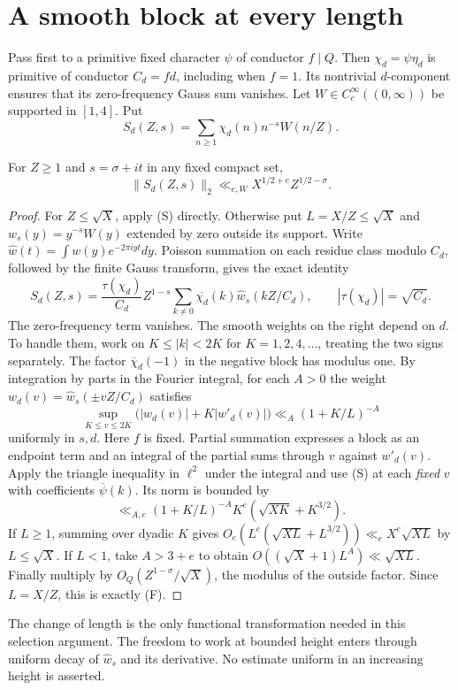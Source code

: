 \documentclass[11pt]{article}
\begin{document}
\section{A smooth block at every length}\label{sec:block}
Pass first to a primitive fixed character $\psi$ of conductor $f\mid Q$. Then $\chi_d=\psi\eta_d$ is primitive of conductor $C_d=fd$, including when $f=1$. Its nontrivial $d$-component ensures that its zero-frequency Gauss sum vanishes. Let $W\in C_c^\infty((0,\infty))$ be supported in $[1,4]$. Put
\[
 S_d(Z,s)=\sum_{n\ge1}\chi_d(n)n^{-s} W(n/Z).
\]
\begin{lem}\label{lem:block}
For $Z\ge1$ and $s=\sigma+it$ in any fixed compact set,
\[
        \|S_d(Z,s)\|_2\ll_{e,W}X^{1/2+e} Z^{1/2-\sigma}.       \tag{F}
\]
\end{lem}
\begin{proof}
For $Z\le\sqrt X$, apply (S) directly. Otherwise put $L=X/Z\le\sqrt X$ and $w_s(y)=y^{-s}W(y)$ extended by zero outside its support. Write $\widehat w(t)=\int w(y)e^{-2\pi iyt}dy$. Poisson summation on each residue class modulo $C_d$, followed by the finite Gauss transform, gives the exact identity
\[
 S_d(Z,s)=\frac{\tau(\chi_d)}{C_d} Z^{1-s}
       \sum_{k\ne0}\overline{\chi_d}(k)\widehat w_s(kZ/C_d),
 \qquad |\tau(\chi_d)|=\sqrt{C_d}.
\]
The zero-frequency term vanishes. The smooth weights on the right depend on $d$. To handle them, work on $K\le |k|<2K$ for $K=1,2,4,\ldots$, treating the two signs separately. The factor $\overline\chi_d(-1)$ in the negative block has modulus one. By integration by parts in the Fourier integral, for each $A>0$ the weight $w_d(v)=\widehat w_s(\pm v Z/C_d)$ satisfies
\[
 \sup_{K\le v\le2K}\big(|w_d(v)|+K|w'_d(v)|\big)
                  \ll_A (1+K/L)^{-A}
\]
uniformly in $s,d$. Here $f$ is fixed. Partial summation expresses a block as an endpoint term and an integral of the partial sums through $v$ against $w'_d(v)$. Apply the triangle inequality in $\ell^2$ under the integral and use (S) at each \emph{fixed} $v$ with coefficients $\overline\psi(k)$. Its norm is bounded by
\[
 \ll_{A,e} (1+K/L)^{-A}K^e(\sqrt{XK}+K^{3/2}).
\]
If $L\ge1$, summing over dyadic $K$ gives $O_e(L^e(\sqrt{XL}+L^{3/2}))\ll_e X^e\sqrt{XL}$ by $L\le\sqrt X$. If $L<1$, take $A>3+e$ to obtain $O((\sqrt X+1)L^A)\ll\sqrt{XL}$. Finally multiply by $O_Q(Z^{1-\sigma}/\sqrt X)$, the modulus of the outside factor. Since $L=X/Z$, this is exactly (F).
\end{proof}
The change of length is the only functional transformation needed in this selection argument. The freedom to work at bounded height enters through uniform decay of $\widehat w_s$ and its derivative. No estimate uniform in an increasing height is asserted.
\end{document}
